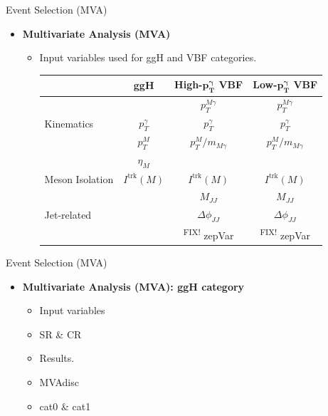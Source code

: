 \documentclass[9pt,aspectratio=1610]{beamer}
\newcommand{\khl}[1]{\textbf{\color{structure}#1}}
\newcommand{\ktodo}[1]{\colorbox{yellow!30}{{\color{red}\textsuperscript{\tiny FIX! }}#1}}
\begin{document}
\begin{frame}{Event Selection (MVA)}
	\begin{itemize}
		\item \khl{Multivariate Analysis (MVA)}
		\vspace{1em}
		\begin{itemize}
			\item Input variables used for ggH and VBF categories.
			\begin{table}
				\centering
				\begin{tabular}{l | c | c | c }
					& \multicolumn{1}{C{8em}|}{\textbf{ggH}} & \multicolumn{1}{C{8em}|}{\textbf{High-\(\mathbf{p^\gamma_T}\) VBF}} & \multicolumn{1}{C{8em}}{\textbf{Low-\(\mathbf{p^\gamma_T}\) VBF}} \\
					\hline
					& & \(p^{M\gamma}_T\) & \(p^{M\gamma}_T\) \\
					Kinematics & \(p^{\gamma}_T\) & \(p^{\gamma}_T\) & \(p^{\gamma}_T\) \\
					& \(p^{M}_T\) & \(p^{M}_T/m_{M\gamma}\) & \(p^{M}_T/m_{M\gamma}\) \\
					 & \(\eta_M\) & & \\
					\hline
					Meson Isolation & \(I^{\mathrm{trk}}(M)\) & \(I^{\mathrm{trk}}(M)\) & \(I^{\mathrm{trk}}(M)\) \\
					\hline
					& & \(M_{JJ}\) & \(M_{JJ}\) \\
					Jet-related & & \(\Delta\phi_{JJ}\) & \(\Delta\phi_{JJ}\) \\
					& & \ktodo{zepVar} & \ktodo{zepVar} \\
				\end{tabular}
			\end{table}
		\end{itemize}
	\end{itemize}
\end{frame}

\begin{frame}{Event Selection (MVA)}
	\begin{itemize}
		\item \khl{Multivariate Analysis (MVA): ggH category}
		\vspace{1em}
		\begin{itemize}
			\item Input variables
			\item SR \& CR
			\item Results.
			\item MVAdisc
			\item cat0 \& cat1
		\end{itemize}
	\end{itemize}
\end{frame}
\end{document}
